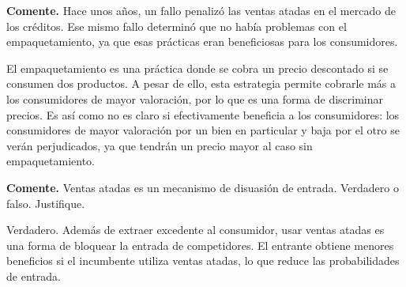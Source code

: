\question \textbf{Comente.} Hace unos años, un fallo penalizó las ventas atadas en el mercado de los créditos. Ese mismo fallo determinó que no había problemas con el empaquetamiento, ya que esas prácticas eran beneficiosas para los consumidores.
\begin{solution}
El empaquetamiento es una práctica donde se cobra un precio descontado si se consumen dos productos. A pesar de ello, esta estrategia permite cobrarle más a los consumidores de mayor valoración, por lo que es una forma de discriminar precios. Es así como no es claro si efectivamente beneficia a los consumidores: los consumidores de mayor valoración por un bien en particular y baja por el otro se verán perjudicados, ya que tendrán un precio mayor al caso sin empaquetamiento.

\end{solution}

\question \textbf{Comente.} Ventas atadas es un mecanismo de disuasión de entrada. Verdadero o falso. Justifique.
\begin{solution}
Verdadero. Además de extraer excedente al consumidor, usar ventas atadas es una forma de bloquear la entrada de competidores. El entrante obtiene menores beneficios si el incumbente utiliza ventas atadas, lo que reduce las probabilidades de entrada.

\end{solution}

